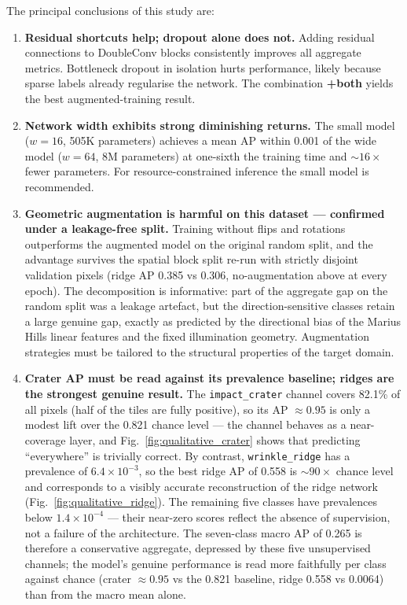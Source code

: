 \documentclass{aa}
\begin{document}
The principal conclusions of this study are:

\begin{enumerate}
    \item \textbf{Residual shortcuts help; dropout alone does not.} Adding residual connections to DoubleConv blocks consistently improves all aggregate metrics. Bottleneck dropout in isolation hurts performance, likely because sparse labels already regularise the network. The combination \textbf{+both} yields the best augmented-training result.

    \item \textbf{Network width exhibits strong diminishing returns.} The small model ($w=16$, 505K parameters) achieves a mean AP within 0.001 of the wide model ($w=64$, 8M parameters) at one-sixth the training time and ${\sim}16\times$ fewer parameters. For resource-constrained inference the small model is recommended.

    \item \textbf{Geometric augmentation is harmful on this dataset --- confirmed under a leakage-free split.} Training without flips and rotations outperforms the augmented model on the original random split, and the advantage survives the spatial block split re-run with strictly disjoint validation pixels (ridge AP 0.385 vs 0.306, no-augmentation above at every epoch). The decomposition is informative: part of the aggregate gap on the random split was a leakage artefact, but the direction-sensitive classes retain a large genuine gap, exactly as predicted by the directional bias of the Marius Hills linear features and the fixed illumination geometry. Augmentation strategies must be tailored to the structural properties of the target domain.

    \item \textbf{Crater AP must be read against its prevalence baseline; ridges are the strongest genuine result.} The \texttt{impact\_crater} channel covers 82.1\% of all pixels (half of the tiles are fully positive), so its AP $\approx 0.95$ is only a modest lift over the 0.821 chance level --- the channel behaves as a near-coverage layer, and Fig.~\ref{fig:qualitative_crater} shows that predicting ``everywhere'' is trivially correct. By contrast, \texttt{wrinkle\_ridge} has a prevalence of $6.4\times10^{-3}$, so the best ridge AP of 0.558 is ${\sim}90\times$ chance level and corresponds to a visibly accurate reconstruction of the ridge network (Fig.~\ref{fig:qualitative_ridge}). The remaining five classes have prevalences below $1.4\times10^{-4}$ --- their near-zero scores reflect the absence of supervision, not a failure of the architecture. The seven-class macro AP of 0.265 is therefore a conservative aggregate, depressed by these five unsupervised channels; the model's genuine performance is read more faithfully per class against chance (crater $\approx0.95$ vs the 0.821 baseline, ridge 0.558 vs 0.0064) than from the macro mean alone.


\end{enumerate}
\end{document}
